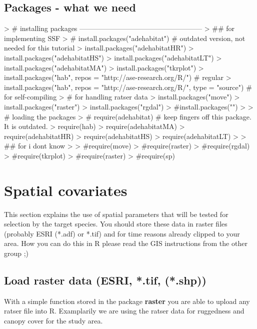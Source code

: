 \documentclass[11pt, a4paper]{article} %
\begin{document}
\subsection{Packages - what we need}

\begin{Schunk}
\begin{Sinput}
> # installing packages -----------------------------------------------------
> ## for implementing SSF
> # install.packages("adehabitat") # outdated version, not needed for this tutorial
> install.packages("adehabitatHR")
> install.packages("adehabitatHS")
> install.packages("adehabitatLT")
> install.packages("adehabitatMA")
> install.packages("tkrplot")
> install.packages("hab", repos = "http://ase-research.org/R/") # regular
> install.packages("hab", repos = "http://ase-research.org/R/", type = "source") # for self-compiling
> # for handling ratser data
> install.packages("move")
> install.packages("raster")
> install.packages("rgdal")
> #install.packages("")
> 
> # loading the packages
> # require(adehabitat) # keep fingers off this package. It is outdated.
> require(hab)
> require(adehabitatMA)
> require(adehabitatHR)
> require(adehabitatHS)
> require(adehabitatLT)
> 
> ## for i dont know
> 
> #require(move)
> #require(raster)
> #require(rgdal)
> #require(tkrplot)
> #require(raster)
> #require(sp)
\end{Sinput}
\end{Schunk}

\section{Spatial covariates}%
This section explains the use of spatial parameters that will be tested for selection by the target species. You should store these data in raster files (probably ESRI (*.adf) or *.tif) and for time reasons already clipped to your area. How you can do this in R please read the GIS instructions from the other group ;)   

\subsection{Load raster data (ESRI, *.tif, (*.shp))}%
With a simple function stored in the package \textbf{raster} you are able to upload any ratser file into R. Examplarily we are using the ratser data for ruggedness and canopy cover for the study area.  
\end{document}
